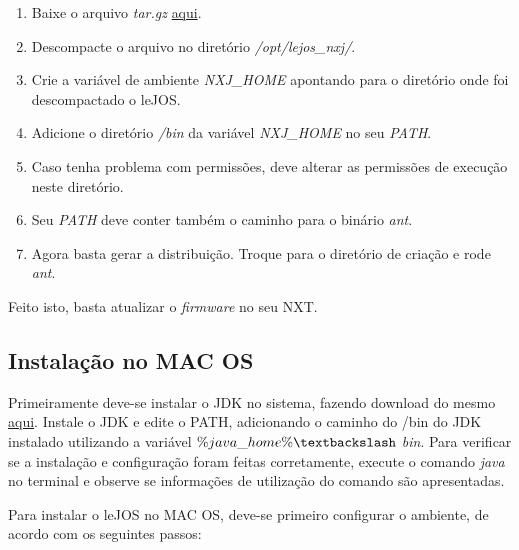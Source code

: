 	\begin{enumerate}
		\item Baixe o arquivo \textit{tar.gz} \href{www.lejos.org}{aqui}.
		\item Descompacte o arquivo no diretório \textit{/opt/lejos\_nxj/}.
		\item Crie a variável de ambiente \textit{NXJ\_HOME} apontando para o diretório onde foi descompactado o leJOS.
		\item Adicione o diretório \textit{/bin} da variável \textit{NXJ\_HOME} no seu \textit{PATH}.
		\item Caso tenha problema com permissões, deve alterar as permissões de execução neste diretório.
		\item Seu \textit{PATH} deve conter também o caminho para o binário \textit{ant}.
		\item Agora basta gerar a distribuição. Troque para o diretório de criação e rode \textit{ant}.
	\end{enumerate}

	Feito isto, basta atualizar o \textit{firmware} no seu NXT.

\subsection{Instalação no MAC OS} %
\label{sub:instalação_no_mac_os}

	Primeiramente deve-se instalar o JDK no sistema, fazendo download do mesmo \href{http://www.oracle.com/technetwork/java/}{aqui}. Instale o JDK e edite o PATH, adicionando o caminho do /bin do JDK instalado utilizando a variável \textit{$\%java\_home\% \textbackslash$ bin}. Para verificar se a instalação e configuração foram feitas corretamente, execute o comando \textit{java} no terminal e observe se informações de utilização do comando são apresentadas.

	Para instalar o leJOS no MAC OS, deve-se primeiro configurar o ambiente, de acordo com os seguintes passos:

